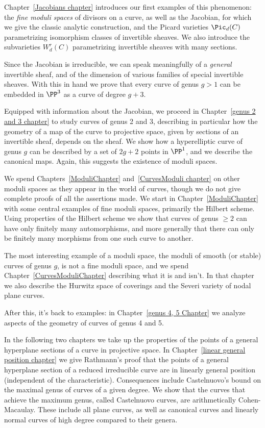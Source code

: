 Chapter~\ref{Jacobians chapter} introduces our first examples of this phenomenon: the \emph{fine moduli spaces} of divisors on a curve, as well as the Jacobian, for which we give the classic analytic construction, and the Picard varieties $\Pic_d(C)$ parametrizing isomorphism classes of invertible sheaves. We also introduce the subvarieties $W^{r}_{d}(C)$ parametrizing invertible sheaves with many sections. 

 Since the Jacobian is irreducible, we can speak meaningfully of a \emph{general} invertible sheaf, and of the dimension of various families of special invertible sheaves. With this in hand we prove
that every curve of genus $g>1$ can be embedded in $\PP^{3}$ as a curve of degree $g+3$.

Equipped with information about the Jacobian, we proceed in Chapter~\ref{genus 2 and 3 chapter} to study curves of genus 2 and 3, describing in particular how the geometry of a map of the curve to projective space,  given by sections of an invertible sheaf, depends on the sheaf. We show how a hyperelliptic curve of genus $g$
can be described by a set of $2g+2$ points in $\PP^{1}$, and we describe the canonical maps. Again, this
suggests the existence of moduli spaces.

We spend Chapters~\ref{ModuliChapter} and~\ref{CurvesModuli chapter} on other moduli spaces as they appear in the world of curves, though we do not give complete proofs of all the assertions made. We start in Chapter~\ref{ModuliChapter} with some central examples of fine moduli spaces, primarily
the Hilbert scheme. Using properties of the Hilbert scheme we show that curves of genus $\geq 2$
can have only finitely many automorphisms, and more generally that there can only be finitely
many morphisms from one such curve to another.

The most interesting example of a moduli space, the moduli of smooth (or stable) curves of genus $g$, is not a fine moduli space, and we spend Chapter~\ref{CurvesModuliChapter} describing what it is and isn't. In that chapter we also describe the Hurwitz space of coverings and the Severi variety of nodal plane curves.

After this, it's back to examples: in Chapter~\ref{genus 4, 5 Chapter} we analyze aspects of the geometry of curves of genus 4 and 5.  

In the following two chapters we take up 
the properties of the points of a general hyperplane sections of a curve in projective space. 
In Chapter~\ref{linear general position chapter} we give Rathmann's proof that
the points of a general hyperplane section of a reduced irreducible curve are in linearly general position (independent of the characteristic).
Consequences include Castelnuovo's bound  on the maximal genus of curves of a given degree.
We show that the curves that achieve the maximum genus, called Castelnuovo curves,
are arithmetically Cohen-Macaulay. These include all plane curves, as well as
canonical curves and linearly normal curves of high degree compared to their genera. 

